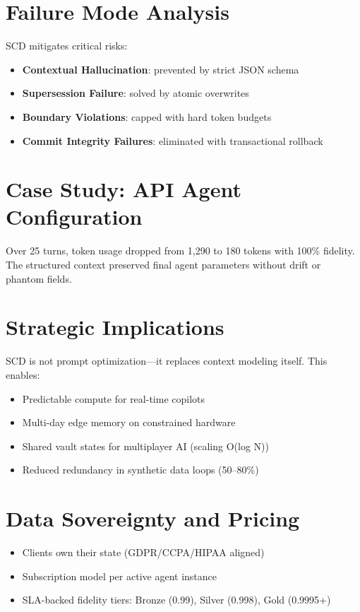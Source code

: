 \documentclass[11pt]{article}
\begin{document}
\section{Failure Mode Analysis}
SCD mitigates critical risks:
\begin{itemize}
    \item \textbf{Contextual Hallucination}: prevented by strict JSON schema
    \item \textbf{Supersession Failure}: solved by atomic overwrites
    \item \textbf{Boundary Violations}: capped with hard token budgets
    \item \textbf{Commit Integrity Failures}: eliminated with transactional rollback
\end{itemize}

\section{Case Study: API Agent Configuration}
Over 25 turns, token usage dropped from 1,290 to 180 tokens with 100\% fidelity. The structured context preserved final agent parameters without drift or phantom fields.

\section{Strategic Implications}
SCD is not prompt optimization---it replaces context modeling itself. This enables:
\begin{itemize}
    \item Predictable compute for real-time copilots
    \item Multi-day edge memory on constrained hardware
    \item Shared vault states for multiplayer AI (scaling O(log N))
    \item Reduced redundancy in synthetic data loops (50--80\%)
\end{itemize}

\section{Data Sovereignty and Pricing}
\begin{itemize}
    \item Clients own their state (GDPR/CCPA/HIPAA aligned)
    \item Subscription model per active agent instance
    \item SLA-backed fidelity tiers: Bronze (0.99), Silver (0.998), Gold (0.9995+)
\end{itemize}
\end{document}
